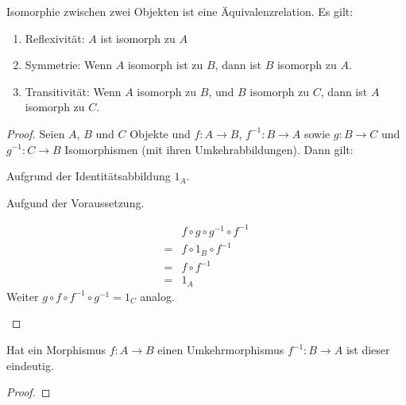 \documentclass[parskip=half]{scrreprt}
\begin{document}
\newpage

\begin{theorem}\label{thm:IsomorphismIsAnEquivalenceRelation}
Isomorphie zwischen zwei Objekten ist eine Äquivalenzrelation. Es gilt:
\begin{enumerate}
\item \label{def:IsoRef} Reflexivität: 
	$A$ ist isomorph zu $A$
\item \label{def:IsoSym} Symmetrie: 
	Wenn $A$ isomorph ist zu $B$, 
	dann ist $B$ isomorph zu $A$.
\item \label{def:IsoTra} Transitivität: 
	Wenn $A$ isomorph zu $B$, 
	und $B$ isomorph zu $C$,
	dann ist $A$ isomorph zu $C$.
\end{enumerate}
\end{theorem}

\begin{proof}
Seien $A$, $B$ und $C$ Objekte und $f: A → B$, $f^{-1}: B → A$ sowie $g: B → C$ 
und $g^{-1}: C → B$ Isomorphismen (mit ihren Umkehrabbildungen).
Dann gilt:
\begin{subproof}[Reflexivität]
Aufgrund der Identitätsabbildung $1_A$.
\end{subproof}
\begin{subproof}[Symmetrie] 
Aufgund der Voraussetzung.
\end{subproof}
\begin{subproof}[Transitivität]
\begin{align*}\label{sp:IsoTrans}
	  &f ∘ g ∘ g^{-1} ∘ f^{-1}  \\	%
	= &f ∘ 1_B ∘ f^{-1}			\\%
	= &f ∘ f^{-1}				\\%
	= &1_A						%
\end{align*}
Weiter $ g ∘ f ∘ f^{-1}∘ g^{-1} = 1_C$ analog.
\end{subproof}
\end{proof}


\begin{theorem}\label{InvertibleMorphismIsUnique}
Hat ein Morphismus $f: A → B$ einen Umkehrmorphismus $f^{-1}: B → A$ ist dieser 
eindeutig.
\end{theorem}
\begin{proof}
\end{proof}
\end{document}
